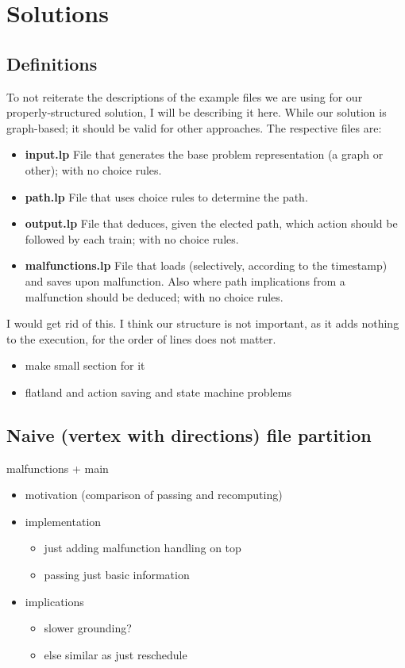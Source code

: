 
\section{Solutions}
\color{green}
\subsection{Definitions}
To not reiterate the descriptions of the example files we are using for our properly-structured solution, I will be describing it here. While our solution is graph-based; it should be valid for other approaches. The respective files are:
\begin{itemize}
	\item  \textbf{input.lp} File that generates the base problem representation (a graph or other); with no choice rules.
	\item  \textbf{path.lp} File that uses choice rules to determine the path.
	\item  \textbf{output.lp} File that deduces, given the elected path, which action should be followed by each train; with no choice rules.
	\item  \textbf{malfunctions.lp} File that loads (selectively, according to the timestamp) and saves upon malfunction. Also where path implications from a malfunction should be deduced; with no choice rules.
\end{itemize}
\color{black} \color{gray} I would get rid of this. I think our structure is not important, as it adds nothing to the execution, for the order of lines does not matter. \color{black}
\color{blue}
\begin{itemize}
	\item make small section for it
	\item flatland and action saving and state machine problems
\end{itemize}
\color{black}



\subsection{Naive (vertex with directions) file partition}
malfunctions + main
\color{blue}
\begin{itemize}
	\item motivation (comparison of passing and recomputing)
	\item implementation
	\begin{itemize}
		\item just adding malfunction handling on top
		\item passing just basic information
	\end{itemize}
	\item implications
	\begin{itemize}
		\item slower grounding?
		\item else similar as just reschedule
	\end{itemize}
\end{itemize}
\color{black}


